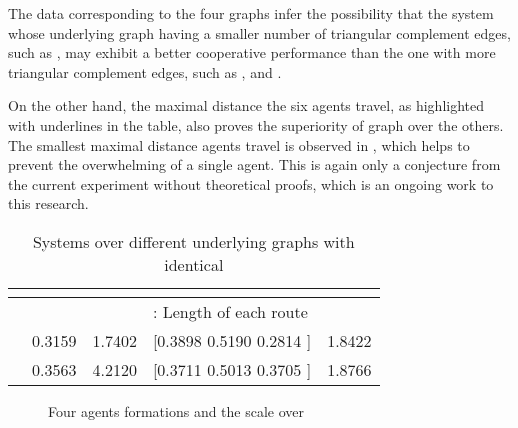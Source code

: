 \documentclass[times]{rncauth}
\begin{document}
The data corresponding to the four graphs infer the possibility that
the system whose underlying graph having a smaller number of
triangular complement edges, such as , may exhibit a better
cooperative performance than the one with more triangular complement
edges, such as ,  and .

On the other hand, the maximal distance the six agents travel, as
highlighted with underlines in the table, also proves the
superiority of graph  over the others. The smallest maximal
distance agents travel is observed in , which helps to prevent
the overwhelming of a single agent. This is again only a conjecture
from the current experiment without theoretical proofs, which is an
ongoing work to this research.



\begin{table}
  \caption{Systems over different underlying graphs with identical }
  \label{table:four}
\begin{center}
\begin{lrbox}{\tablebox}
\begin{tabular}{|l|l|l|l|l|}
\hline \multicolumn{5}{|c|}{
} \\
\hline
&   &   &  : Length of each route & \\
\hline
 &0.3159 & 1.7402&  [0.3898  0.5190  0.2814  ]  &  1.8422\\
& 0.3563  &4.2120 & [0.3711  0.5013  0.3705  ]  &  1.8766\\
\hline
\end{tabular}
\end{lrbox}
\scalebox{0.7}{\usebox{\tablebox}}
\end{center}
\end{table}

\begin{figure}
\caption{Four agents formations and the scale  over
}\label{fig:four_formation}
\end{figure}
\end{document}
